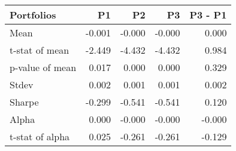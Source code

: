 \begin{tabular}{lrrrr}
\toprule
Portfolios & P1 & P2 & P3 & P3 - P1 \\
\midrule
Mean & -0.001 & -0.000 & -0.000 & 0.000 \\
t-stat of mean & -2.449 & -4.432 & -4.432 & 0.984 \\
p-value of mean & 0.017 & 0.000 & 0.000 & 0.329 \\
Stdev & 0.002 & 0.001 & 0.001 & 0.002 \\
Sharpe & -0.299 & -0.541 & -0.541 & 0.120 \\
Alpha & 0.000 & -0.000 & -0.000 & -0.000 \\
t-stat of alpha & 0.025 & -0.261 & -0.261 & -0.129 \\
\bottomrule
\end{tabular}
